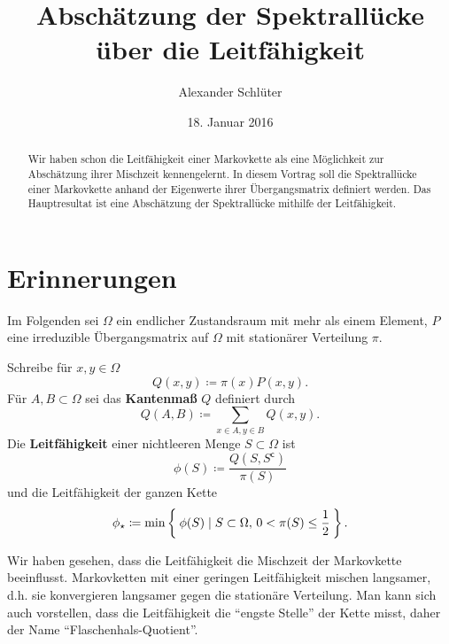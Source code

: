 \documentclass[ngerman,a4paper,11pt]{scrartcl}
\newcommand{\stcomp}[1]{{#1}^{\mathsf{c}}} %
\begin{document}
\title{Abschätzung der Spektrallücke über die Leitfähigkeit}
\author{Alexander Schlüter}
\date{18. Januar 2016}
\maketitle
\begin{abstract}
Wir haben schon die Leitfähigkeit einer Markovkette als eine Möglichkeit zur
Abschätzung ihrer Mischzeit kennengelernt. In diesem Vortrag soll die
Spektrallücke einer Markovkette anhand der Eigenwerte ihrer Übergangsmatrix
definiert werden. Das Hauptresultat ist eine Abschätzung der Spektrallücke
mithilfe der Leitfähigkeit.
\end{abstract}
\tableofcontents

\section{Erinnerungen}

Im Folgenden sei $\Omega$ ein endlicher Zustandsraum mit mehr als einem Element, $P$ eine irreduzible Übergangsmatrix auf $\Omega$ mit stationärer Verteilung $\pi$.
\begin{defn}
 Schreibe für $x, y\in\Omega$ 
 \begin{equation*}
  Q(x,y)\coloneqq\pi(x)P(x,y).
 \end{equation*}
 Für $A, B\subset\Omega$ sei das \textbf{Kantenmaß} $Q$ definiert durch
 \begin{equation*}
   Q(A,B)\coloneqq\sum_{x\in A, y\in B}Q(x,y). 
 \end{equation*}
 Die \textbf{Leitfähigkeit} einer nichtleeren Menge $S\subset\Omega$ ist
 \begin{equation*}
  \phi(S)\coloneqq\frac{Q(S,\stcomp{S})}{\pi(S)} 
 \end{equation*}
 und die Leitfähigkeit der ganzen Kette
 \begin{equation*}
  \phi_\star\coloneqq\min\Set{\phi(S)\mid S\subset\Omega,\,0<\pi(S)\leq\frac{1}{2}}.
 \end{equation*}
\end{defn}
Wir haben gesehen, dass die Leitfähigkeit die Mischzeit der Markovkette
beeinflusst. Markovketten mit einer geringen Leitfähigkeit mischen langsamer,
d.h. sie konvergieren langsamer gegen die stationäre Verteilung. Man kann sich
auch vorstellen, dass die Leitfähigkeit die \enquote{engste Stelle} der Kette misst,
daher der Name \enquote{Flaschenhals-Quotient}.
\end{document}
